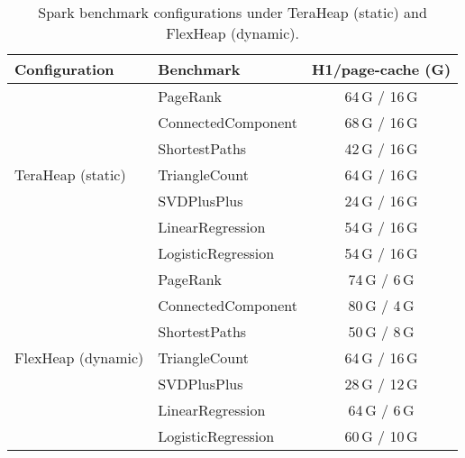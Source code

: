 \begin{table}[htbp]
\centering
\small
\renewcommand{\arraystretch}{0.8}
\caption{Spark benchmark configurations under TeraHeap (static) and FlexHeap (dynamic).}
\label{tab:spark-benchmark-configs}
\begin{tabular}{|l|l|c|}
\hline
\textbf{Configuration} & \textbf{Benchmark} & \textbf{H1/page-cache (G)} \\
\hline
\multirow{7}{*}{TeraHeap (static)} 
& PageRank             & 64\,G / 16\,G \\
& ConnectedComponent   & 68\,G / 16\,G \\
& ShortestPaths        & 42\,G / 16\,G \\
& TriangleCount        & 64\,G / 16\,G \\
& SVDPlusPlus          & 24\,G / 16\,G \\
& LinearRegression     & 54\,G / 16\,G \\
& LogisticRegression   & 54\,G / 16\,G \\
\hline
\multirow{7}{*}{FlexHeap (dynamic)} 
& PageRank             & 74\,G / 6\,G  \\
& ConnectedComponent   & 80\,G / 4\,G  \\
& ShortestPaths        & 50\,G / 8\,G \\
& TriangleCount        & 64\,G / 16\,G \\
& SVDPlusPlus          & 28\,G / 12\,G \\
& LinearRegression     & 64\,G / 6\,G  \\
& LogisticRegression   & 60\,G / 10\,G \\
\hline
\end{tabular}
\end{table}

\vspace{1em} %
%

